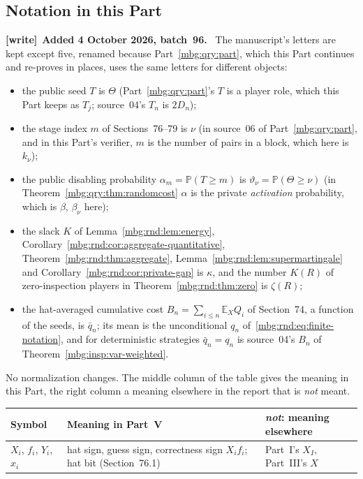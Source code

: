 \documentclass[11pt,letterpaper]{article}
\theoremstyle{definition}
\newcommand{\E}{\mathbb E}
\newcommand{\Prb}{\mathbb P}
\newenvironment{writenote}[1][]{\par\smallskip\begingroup\small
 \noindent\textbf{[write]}\if\relax\detokenize{#1}\relax\else~\textbf{#1.}\fi\ }%
 {\par\endgroup\smallskip}
\begin{document}
\subsection{Notation in this Part}
\label{mbg:rnd:sec:notation}

\begin{writenote}[Added 4 October 2026, batch~96]
The manuscript's letters are kept except five, renamed because Part~\ref{mbg:qry:part}, which this Part continues and re-proves in places, uses the same letters for different objects:
\begin{itemize}
\item the public seed $T$ is $\Theta$ (Part~\ref{mbg:qry:part}'s $T$ is a player role, which this Part keeps as $T_j$; source~04's $T_n$ is $2D_n$);
\item the stage index $m$ of Sections~76--79 is $\nu$ (in source~06 of Part~\ref{mbg:qry:part}, and in this Part's verifier, $m$ is the number of pairs in a block, which here is $k_\nu$);
\item the public disabling probability $\alpha_m=\Prb(T\ge m)$ is $\vartheta_\nu=\Prb(\Theta\ge\nu)$ (in Theorem~\ref{mbg:qry:thm:randomcost} $\alpha$ is the private \emph{activation} probability, which is $\beta$, $\beta_\nu$ here);
\item the slack $K$ of Lemma~\ref{mbg:rnd:lem:energy}, Corollary~\ref{mbg:rnd:cor:aggregate-quantitative}, Theorem~\ref{mbg:rnd:thm:aggregate}, Lemma~\ref{mbg:rnd:lem:supermartingale} and Corollary~\ref{mbg:rnd:cor:private-gap} is $\kappa$, and the number $K(R)$ of zero-inspection players in Theorem~\ref{mbg:rnd:thm:zero} is $\zeta(R)$;
\item the hat-averaged cumulative cost $B_n=\sum_{i\le n}\E_XQ_i$ of Section~74, a function of the seeds, is $\bar q_n$; its mean is the unconditional $q_n$ of~\eqref{mbg:rnd:eq:finite-notation}, and for deterministic strategies $\bar q_n=q_n$ is source~04's $B_n$ of Theorem~\ref{mbg:insp:var-weighted}.
\end{itemize}
No normalization changes. The middle column of the table gives the meaning in this Part, the right column a meaning elsewhere in the report that is \emph{not} meant.
\begin{longtable}{>{\raggedright\arraybackslash}p{}>{\raggedright\arraybackslash}p{}>{\raggedright\arraybackslash}p{}}
\toprule
Symbol & Meaning in Part~V & \emph{not}: meaning elsewhere\\
\midrule
\endhead
$X_i$, $f_i$, $Y_i$, $x_i$ & hat sign, guess sign, correctness sign $X_if_i$; hat bit (Section~76.1) & Part~I's $X_I$, Part~III's $X$\\

\end{longtable}
\end{writenote}
\end{document}
